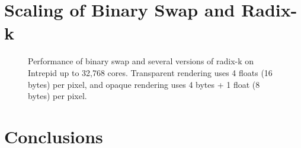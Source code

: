 \documentclass{vgtc}                          %
\begin{document}
\section{Scaling of Binary Swap and Radix-k}
\label{sec:Scaling}

\begin{figure}[htbp]
  \centering
  \hfill
  \caption{Performance of binary swap and several versions of radix-k on
    Intrepid up to 32,768 cores.  Transparent rendering uses 4 floats (16
    bytes) per pixel, and opaque rendering uses 4 bytes + 1 float (8 bytes)
    per pixel.}
\end{figure}

\section{Conclusions}
\label{sec:Conclusions}
\end{document}
